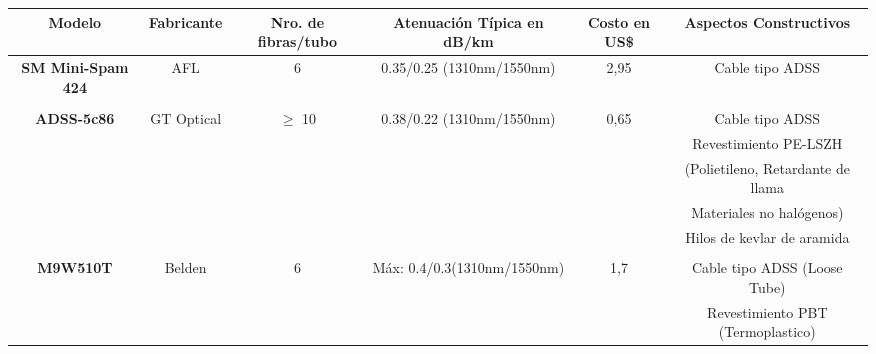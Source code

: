 \begin{table}[H]
  \tiny  
  \centering
    \begin{tabular}{|c|c|c|c|c|cc|}
    \hline
    \rowcolor[rgb]{ .773,  .851,  .945} \textbf{Modelo} & \textbf{Fabricante} & \textbf{Nro. de fibras/tubo} & \textbf{Atenuación Típica en dB/km} & \textbf{Costo en US\$} & \multicolumn{2}{c|}{\textbf{Aspectos Constructivos}} \bigstrut\\
    \hline
    \multirow{6}[2]{*}{\textbf{SM Mini-Spam 424}} & \multirow{6}[2]{*}{AFL} & \multirow{6}[2]{*}{6} & \multirow{6}[2]{*}{0.35/0.25 (1310nm/1550nm)} & \multirow{6}[2]{*}{2,95} & \multicolumn{2}{c|}{Cable tipo ADSS} \bigstrut[t]\\
          &       &       &       &       & \multicolumn{2}{c|}{} \\
          &       &       &       &       & \multicolumn{2}{c|}{} \\
          &       &       &       &       & \multicolumn{2}{c|}{} \\
          &       &       &       &       & \multicolumn{2}{c|}{} \\
          &       &       &       &       & \multicolumn{2}{c|}{} \bigstrut[b]\\
    \hline
    \multirow{6}[2]{*}{\textbf{ADSS-5c86}} & \multirow{6}[2]{*}{GT Optical} & \multirow{6}[2]{*}{$\geq$ 10} & \multirow{6}[2]{*}{0.38/0.22 (1310nm/1550nm)} & \multirow{6}[2]{*}{0,65} & \multicolumn{2}{c|}{Cable tipo ADSS} \bigstrut[t]\\
          &       &       &       &       & \multicolumn{2}{c|}{Revestimiento PE-LSZH } \\
          &       &       &       &       & \multicolumn{2}{c|}{(Polietileno, Retardante de llama} \\
          &       &       &       &       & \multicolumn{2}{c|}{Materiales no halógenos)} \\
          &       &       &       &       & \multicolumn{2}{c|}{Hilos de kevlar de aramida} \\
          &       &       &       &       & \multicolumn{2}{c|}{} \bigstrut[b]\\
    \hline
    \multirow{9}[2]{*}{\textbf{M9W510T}} & \multirow{9}[2]{*}{Belden} & \multirow{9}[2]{*}{6} & \multirow{9}[2]{*}{Máx: 0.4/0.3(1310nm/1550nm)} & \multirow{9}[2]{*}{1,7} & \multicolumn{2}{c|}{Cable tipo ADSS (Loose Tube)} \bigstrut[t]\\
          &       &       &       &       & \multicolumn{2}{c|}{Revestimiento PBT (Termoplastico)} \\

\end{tabular}
\end{table}
